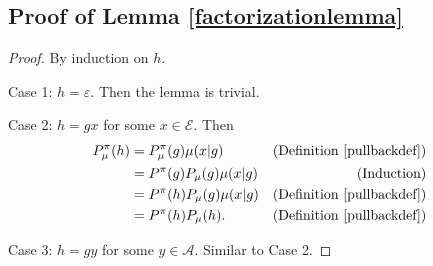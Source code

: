 \documentclass[twoside]{article}
\begin{document}
\subsection{Proof of Lemma \ref{factorizationlemma}}
\begin{proof}
    By induction on $h$.

    Case 1: $h=\varepsilon$. Then the lemma is trivial.

    Case 2: $h=gx$ for some $x\in\mathcal E$.
        Then
        \begin{align*}
            P^\pi_\mu(h)
                &= P^\pi_\mu(g)\mu(x|g)
                    &\mbox{(Definition \ref{pullbackdef})}\\
                &= P^\pi(g)P_\mu(g)\mu(x|g)
                    &\mbox{(Induction)}\\
                &= P^\pi(h)P_\mu(g)\mu(x|g)
                    &\mbox{(Definition \ref{pullbackdef})}\\
                &= P^\pi(h)P_\mu(h).
                    &\mbox{(Definition \ref{pullbackdef})}
        \end{align*}

    Case 3: $h=gy$ for some $y\in\mathcal A$.
        Similar to Case 2.
\end{proof}
\end{document}

